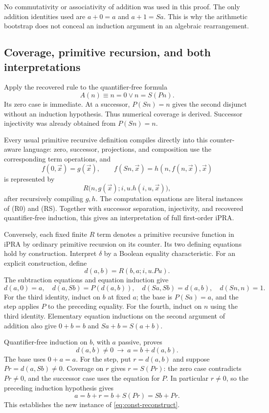 \documentclass[11pt]{article}
\theoremstyle{definition}\newtheorem{definition}[theorem]{Definition}
\begin{document}
No commutativity or associativity of addition was used in this proof.
The only addition identities used are $a+0=a$ and $a+1=Sa$.
This is why the arithmetic bootstrap does not conceal an induction
argument in an algebraic rearrangement.

\subsection{Coverage, primitive recursion, and both interpretations}

Apply the recovered rule to the quantifier-free formula
\[
                  A(n)\equiv n=0\lor n=S(Pn).
\]
Its zero case is immediate.  At a successor, $P(Sn)=n$ gives the second
disjunct without an induction hypothesis.  Thus numerical coverage is
derived.  Successor injectivity was already obtained from $P(Sn)=n$.

Every usual primitive recursive definition compiles directly into this
counter-aware language: zero, successor, projections, and composition use
the corresponding term operations, and
\[
 f(0,\vec x)=g(\vec x),\qquad
 f(Sn,\vec x)=h(n,f(n,\vec x),\vec x)
\]
is represented by
\[
 R\bigl(n,g(\vec x);i,u.h(i,u,\vec x)\bigr),
\]
after recursively compiling $g,h$.  The computation equations are
literal instances of \textup{(R0)} and \textup{(RS)}.  Together with
successor separation, injectivity, and recovered quantifier-free
induction, this gives an interpretation of full first-order iPRA.

Conversely, each fixed finite $R$ term denotes a primitive recursive
function in iPRA by ordinary primitive recursion on its counter.  Its
two defining equations hold by construction.  Interpret $\delta$ by a
Boolean equality characteristic.  For an explicit construction, define
\[
                         d(a,b)=R(b,a;i,u.Pu).
\]
The subtraction equations and equation induction give
\[
 d(a,0)=a,\quad d(a,Sb)=P(d(a,b)),\quad
 d(Sa,Sb)=d(a,b),\quad d(Sn,n)=1.
\]
For the third identity, induct on $b$ at fixed $a$; the base is
$P(Sa)=a$, and the step applies $P$ to the preceding equality.
For the fourth, induct on $n$ using the third identity.  Elementary
equation inductions on the second argument of addition also give
$0+b=b$ and $Sa+b=S(a+b)$.

Quantifier-free induction on $b$, with $a$ passive, proves
\[
           d(a,b)\ne0\ \longrightarrow\ a=b+d(a,b).
 \tag{Rec}\label{eq:const-reconstruct}
\]
The base uses $0+a=a$.  For the step, put $r=d(a,b)$ and suppose
$Pr=d(a,Sb)\ne0$.  Coverage on $r$ gives $r=S(Pr)$: the zero case
contradicts $Pr\ne0$, and the successor case uses the equation for $P$.
In particular $r\ne0$, so the preceding induction hypothesis gives
\[
              a=b+r=b+S(Pr)=Sb+Pr.
\]
This establishes the new instance of \eqref{eq:const-reconstruct}.
\end{document}
